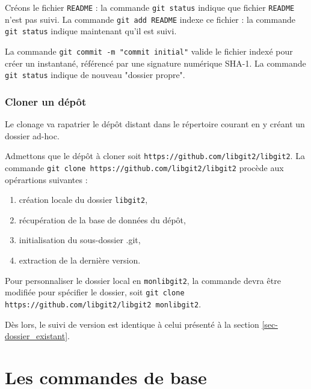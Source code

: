 \documentclass[11pt,twoside,headings=normal,open=right,french,DIV=12]{scrreprt}
\newcommand{\spec}[1]{\texttt{#1}}
\begin{document}
     Créons le fichier  \spec{README} : la commande \verb|git status| indique que fichier \spec{README} n'est pas suivi. La commande \verb|git add README| indexe ce fichier : la commande \verb|git status| indique maintenant qu'il est suivi.
     
    \smallskip    
    
    La commande \verb|git commit -m "commit initial"| valide le fichier indexé pour créer un instantané, référencé par une signature numérique SHA-1. La commande \verb|git status| indique de nouveau "dossier propre".



\subsection{Cloner un dépôt}



    Le clonage va rapatrier le dépôt distant dans le répertoire courant en y créant un dossier ad-hoc. 
    
    \smallskip
    
    Admettons que le dépôt à cloner soit \spec{https://github.com/libgit2/libgit2}. La commande
    \verb|git clone https://github.com/libgit2/libgit2| procède aux opérartions suivantes :
    \begin{enumerate}
        \item création locale du dossier \spec{libgit2},
        \item récupération de la base de données du dépôt,
        \item initialisation du sous-dossier .git,
        \item extraction de la dernière version.    
    \end{enumerate}

    Pour personnaliser le dossier local en \spec{monlibgit2}, la commande devra être modifiée pour spécifier le dossier,
    soit \verb|git clone https://github.com/libgit2/libgit2 monlibgit2|.
    
    \smallskip
    
    Dès lors, le suivi de version est identique à celui présenté à la section \ref{sec-dossier_existant}.



\chapter{Les commandes de base}
\end{document}
